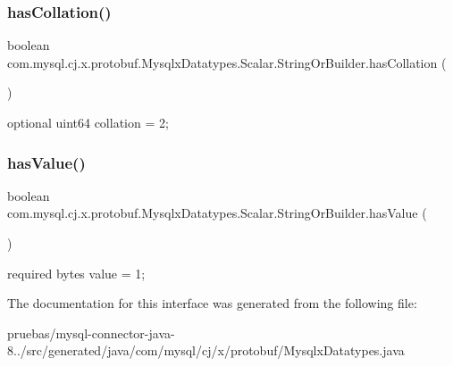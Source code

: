\subsubsection{\texorpdfstring{has\+Collation()}{hasCollation()}}
{\footnotesize\ttfamily boolean com.\+mysql.\+cj.\+x.\+protobuf.\+Mysqlx\+Datatypes.\+Scalar.\+String\+Or\+Builder.\+has\+Collation (\begin{DoxyParamCaption}{ }\end{DoxyParamCaption})}

{\ttfamily optional uint64 collation = 2;} \mbox{\label{interfacecom_1_1mysql_1_1cj_1_1x_1_1protobuf_1_1_mysqlx_datatypes_1_1_scalar_1_1_string_or_builder_a08394cea2016128a422efdf2fea938e8}} 
\subsubsection{\texorpdfstring{has\+Value()}{hasValue()}}
{\footnotesize\ttfamily boolean com.\+mysql.\+cj.\+x.\+protobuf.\+Mysqlx\+Datatypes.\+Scalar.\+String\+Or\+Builder.\+has\+Value (\begin{DoxyParamCaption}{ }\end{DoxyParamCaption})}

{\ttfamily required bytes value = 1;} 

The documentation for this interface was generated from the following file\+:\begin{DoxyCompactItemize}
\item 
pruebas/mysql-\/connector-\/java-\/8../src/generated/java/com/mysql/cj/x/protobuf/Mysqlx\+Datatypes.\+java\end{DoxyCompactItemize}
